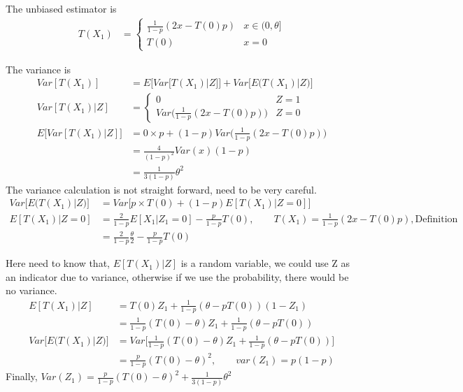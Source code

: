 The unbiased estimator is 
	\begin{align*}
		T(X_1) &= \begin{cases}
		\frac{1}{1- p} (2x - T(0)p ) & x \in (0, \theta] \\
		T(0) & x= 0
		\end{cases}
	\end{align*}	

The variance is
	\begin{align*}
	Var[T(X_1)] &= E \big[ Var[T(X_1)| Z] \big] + Var \big[E \big(T(X_1)|Z \big) \big] \\
	Var[T(X_1)| Z] &=  \begin{cases}
	0 & Z = 1 \\
	Var \big(\frac{1}{1- p} (2x - T(0)p )  \big) & Z  = 0
	\end{cases}\\
	E \big[ Var[T(X_1)| Z] \big]&=0 \times p + (1-p) Var \big(\frac{1}{1- p} (2x - T(0)p )  \big)  \\
	&= \frac{4}{(1-p)^2} Var(x) (1-p) \\
	& = \frac{1}{3(1-p)} \theta^2
	\end{align*}	
The variance calculation is not straight forward, need to be very careful.
	\begin{align*}
	Var \big[E \big(T(X_1)|Z \big) \big] &= Var \big[p \times T(0) + (1-p) E [T(X_1) | Z= 0] \big] \\
	E [T(X_1) | Z= 0] &= \frac{2}{1-p} E[X_1 | Z_1 = 0] - \frac{p}{1-p} T(0) , \qquad T(X_1) = \frac{1}{1- p} (2x - T(0)p ) , \text{Definition}\\
	&= \frac{2}{1-p} \frac{\theta}{2} -  \frac{p}{1-p} T(0) 
	\end{align*}	

Here need to know that, $E [T(X_1) | Z] $ is a random variable, we could use Z as an indicator due to variance, otherwise if we use the probability, there would be no variance.
	\begin{align*}
	E [T(X_1) | Z] &= T(0) Z_1 +  \frac{1}{1-p} (\theta - p T(0)) (1- Z_1)\\
	&=  \frac{1}{1-p} ( T(0) - \theta ) Z_1 +  \frac{1}{1-p} (\theta - p T(0)) \\
	Var \big[E \big(T(X_1)|Z \big) \big] &= Var \Big[ \frac{1}{1-p} ( T(0) - \theta ) Z_1 +  \frac{1}{1-p} (\theta - p T(0)) \Big] \\
	&= \frac{p}{1-p} (T(0) - \theta)^2, \qquad var(Z_1) = p(1-p)
	\end{align*}	
Finally, $Var(Z_1) =\frac{p}{1-p} (T(0) - \theta)^2 + \frac{1}{3(1-p)} \theta^2 $



